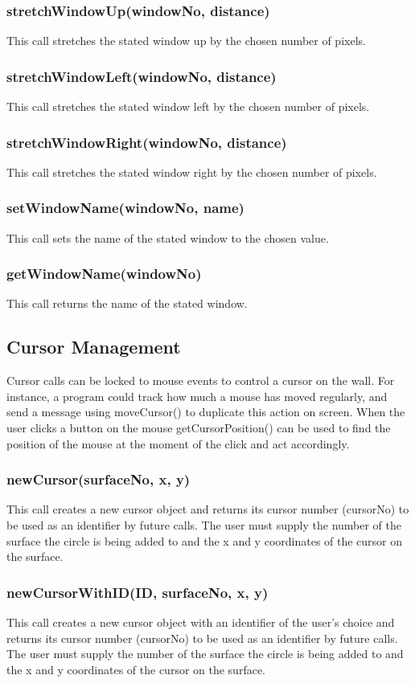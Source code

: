 \documentclass{acm_proc_article-sp}
\begin{document}
\subsubsection{stretchWindowUp(windowNo, distance)}
This call stretches the stated window up by the chosen number of pixels.
\subsubsection{stretchWindowLeft(windowNo, distance)}
This call stretches the stated window left by the chosen number of pixels.
\subsubsection{stretchWindowRight(windowNo, distance)}
This call stretches the stated window right by the chosen number of pixels.
\subsubsection{setWindowName(windowNo, name)}
This call sets the name of the stated window to the chosen value.
\subsubsection{getWindowName(windowNo)}
This call returns the name of the stated window.
\subsection{Cursor Management}
Cursor calls can be locked to mouse events to control a cursor on the wall. For instance, a program could track how much a mouse has moved regularly, and send a message using moveCursor() to duplicate this action on screen. When the user clicks a button on the mouse getCursorPosition() can be used to find the position of the mouse at the moment of the click and act accordingly.
\subsubsection{newCursor(surfaceNo, x, y)}
This call creates a new cursor object and returns its cursor number (cursorNo) to be used as an identifier by future calls. The user must supply the number of the surface the circle is being added to and the x and y coordinates of the cursor on the surface.
\subsubsection{newCursorWithID(ID, surfaceNo, x, y)}
This call creates a new cursor object with an identifier of the user's choice and returns its cursor number (cursorNo) to be used as an identifier by future calls. The user must supply the number of the surface the circle is being added to and the x and y coordinates of the cursor on the surface.
\end{document}
